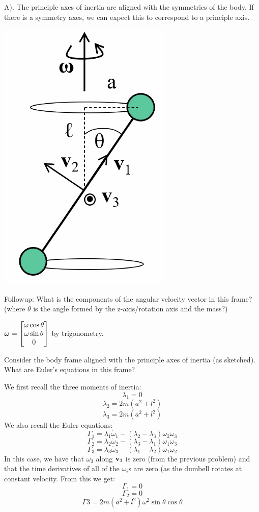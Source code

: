 \begin{s}
A). The principle axes of inertia are aligned with the symmetries of the body. If there is a symmetry axes, we can expect this to correspond to a principle axis.
\end{s}
\begin{center}
    \includegraphics[scale=0.5]{Lecture-20/l20-img3.png}
\end{center}
Followup: What is the components of the angular velocity vector in this frame? (where $\theta$ is the angle formed by the z-axis/rotation axis and the mass?)
\begin{s}
$\bm{\omega} = \begin{bmatrix}\omega\cos\theta \\ \omega\sin\theta \\ 0\end{bmatrix}$ by trigonometry. 
\end{s}
Consider the body frame aligned with the principle axes of inertia (as sketched). What are Euler's equations in this frame?
\begin{s}
We first recall the three moments of inertia:
\[\lambda_1 = 0\]
\[\lambda_2 = 2m(a^2 + l^2)\]
\[\lambda_3 = 2m(a^2 + l^2)\]
We also recall the Euler equations:
\[\Gamma_1 = \lambda_1\dot{\omega}_1 - (\lambda_2 - \lambda_3)\omega_2\omega_3\]
\[\Gamma_2 = \lambda_2\dot{\omega}_2 - (\lambda_3 - \lambda_1)\omega_1\omega_3\]
\[\Gamma_3 = \lambda_3\dot{\omega}_3 - (\lambda_1 - \lambda_2)\omega_1\omega_2\]
In this case, we have that $\omega_3$ along $\mathbf{v}_3$ is zero (from the previous problem) and that the time derivatives of all of the $\omega_i$s are zero (as the dumbell rotates at constant velocity. From this we get:
\[\Gamma_1 = 0\]
\[\Gamma_2 = 0\]
\[\Gamma3 = 2m(a^2 + l^2)\omega^2\sin\theta\cos\theta\]
\end{s}

